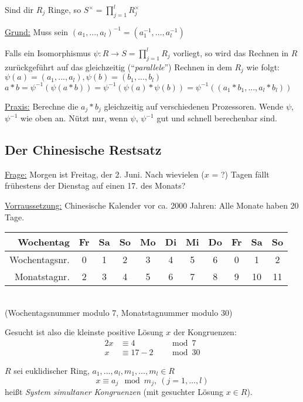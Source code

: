 \documentclass[a4paper,DIV15,BCOR12mm]{article}
\begin{document}
\begin{lemma}
Sind dir $R_j$ Ringe, so $S^\times = \prod_{j=1}^lR_j^\times$
\end{lemma}

\underline{Grund:} Muss sein $(a_1, ..., a_l)^{-1} = (a_1^{-1}, ...,
a_l^{-1})$

Falls ein Isomorphismus $\psi: R \to S = \prod_{j=1}^lR_j$ vorliegt, so wird das Rechnen in $R$ zurückgeführt auf das gleichzeitig ("`\emph{parallele}"') Rechnen in dem $R_j$ wie folgt:\\
$\psi(a) = (a_1,...,a_l), \psi(b) = (b_1,...,b_l)$\\
$a \ast b = \psi^{-1}(\psi(a \ast b)) = \psi^{-1}(\psi(a) \ast
\psi(b)) = \psi^{-1}((a_1 \ast b_1, ..., a_l \ast b_l))$

\underline{Praxis:} Berechne die $a_j \ast b_j$ gleichzeitig auf
verschiedenen Prozessoren. Wende $\psi$, $\psi^{-1}$ wie oben an.
Nützt nur, wenn $\psi$, $\psi^{-1}$ gut und schnell berechenbar
sind.

\subsection{Der Chinesische Restsatz}

\underline{Frage:} Morgen ist Freitag, der 2. Juni. Nach wievielen
($x$ = ?) Tagen fällt frühestens der Dienstag auf einen 17. des
Monats?

\underline{Vorraussetzung:} Chinesische Kalender vor ca. 2000
Jahren: Alle Monate haben 20 Tage.

\begin{tabular}{|r|c|c|c|c|c|c|c|c|c|c|}
    \hline
    Wochentag     & Fr & Sa & So & Mo & Di & Mi & Do & Fr & Sa & So \\
    \hline
    Wochentagsnr. & 0  & 1  & 2  & 3  & 4  & 5  & 6  & 0  & 1  & 2  \\
    \hline
    Monatstagnr.  & 2  & 3  & 4  &  5 & 6  & 7  & 8  & 9  & 10 & 11 \\
    \hline
\end{tabular}
\\(Wochentagsnummer modulo 7, Monatstagnummer modulo 30)

Gesucht ist also die kleinste positive Lösung $x$ der Kongruenzen:
\begin{alignat*}{2}
    x &\equiv 4 &&\mod 7\\
    x &\equiv 17-2 &&\mod 30
\end{alignat*}

$R$ sei euklidischer Ring, $a_1,\ldots,a_l, m_1,\ldots,m_l \in R$\\
\begin{equation}\label{eq:SystemSimultanerKongruenz}
x \equiv a_j \mod m_j,\ (j = 1, \ldots, l)
\end{equation}
heißt \emph{System simultaner Kongruenzen} (mit gesuchter Lösung $x
\in R$).
\end{document}
